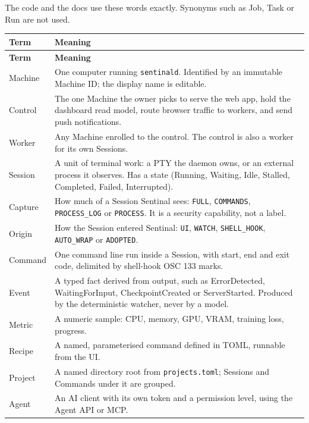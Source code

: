 The code and the docs use these words exactly. Synonyms such as Job, Task or Run are not used.

\begin{small}
\begin{longtable}{>{\raggedright\arraybackslash}p{0.166\dimexpr \linewidth-4\tabcolsep\relax}>{\raggedright\arraybackslash}p{0.834\dimexpr \linewidth-4\tabcolsep\relax}}
\toprule
\textbf{Term} & \textbf{Meaning} \\
\midrule
\endfirsthead
\toprule
\textbf{Term} & \textbf{Meaning} \\
\midrule
\endhead
Machine & One computer running \texttt{sentinald}. Identified by an immutable Machine ID; the display name is editable. \\
Control & The one Machine the owner picks to serve the web app, hold the dashboard read model, route browser traffic to workers, and send push notifications. \\
Worker & Any Machine enrolled to the control. The control is also a worker for its own Sessions. \\
Session & A unit of terminal work: a PTY the daemon owns, or an external process it observes. Has a state (Running, Waiting, Idle, Stalled, Completed, Failed, Interrupted). \\
Capture & How much of a Session Sentinal sees: \texttt{FULL}, \texttt{COMMANDS}, \texttt{PROCESS\_\allowbreak{}LOG} or \texttt{PROCESS}. It is a security capability, not a label. \\
Origin & How the Session entered Sentinal: \texttt{UI}, \texttt{WATCH}, \texttt{SHELL\_\allowbreak{}HOOK}, \texttt{AUTO\_\allowbreak{}WRAP} or \texttt{ADOPTED}. \\
Command & One command line run inside a Session, with start, end and exit code, delimited by shell-hook OSC 133 marks. \\
Event & A typed fact derived from output, such as ErrorDetected, WaitingForInput, CheckpointCreated or ServerStarted. Produced by the deterministic watcher, never by a model. \\
Metric & A numeric sample: CPU, memory, GPU, VRAM, training loss, progress. \\
Recipe & A named, parameterised command defined in TOML, runnable from the UI. \\
Project & A named directory root from \texttt{projects.\allowbreak{}toml}; Sessions and Commands under it are grouped. \\
Agent & An AI client with its own token and a permission level, using the Agent API or MCP. \\
\bottomrule
\end{longtable}
\end{small}

